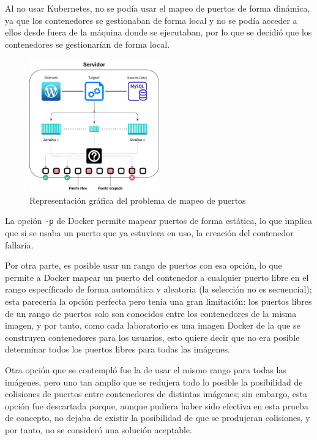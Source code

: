             Al no usar Kubernetes, no se podía usar el mapeo de puertos de forma dinámica, ya que los contenedores se gestionaban de forma local y no se podía acceder a ellos desde fuera de la máquina donde se ejecutaban, por lo que se decidió que los contenedores se gestionarían de forma local.

            \begin{figure}[htbp]
                \centering

                \includegraphics[width=0.5\textwidth]{images/Diagramas/puertos.png}
                \caption{Representación gráfica del problema de mapeo de puertos}
                \label{fig:mapeo-puertos}
            \end{figure}

            La opción \texttt{-p} de Docker permite mapear puertos de forma estática, lo que implica que si se usaba un puerto que ya estuviera en uso, la creación del contenedor fallaría.
            
            Por otra parte, es posible usar un rango de puertos con esa opción, lo que permite a Docker mapear un puerto del contenedor a cualquier puerto libre en el rango específicado de forma automática y aleatoria (la selección no es secuencial); esta parecería la opción perfecta pero tenía una gran limitación: los puertos libres de un rango de puertos solo son conocidos entre los contenedores de la misma imagen, y por tanto, como cada laboratorio es una imagen Docker de la que se construyen contenedores para los usuarios, esto quiere decir que no era posible determinar todos los puertos libres para todas las imágenes.
            
            Otra opción que se contempló fue la de usar el mismo rango para todas las imágenes, pero uno tan amplio que se redujera todo lo posible la posibilidad de colisiones de puertos entre contenedores de distintas imágenes; sin embargo, esta opción fue descartada porque, aunque pudiera haber sido efectiva en esta prueba de concepto, no dejaba de existir la posibilidad de que se produjeran colisiones, y por tanto, no se consideró una solución aceptable.

